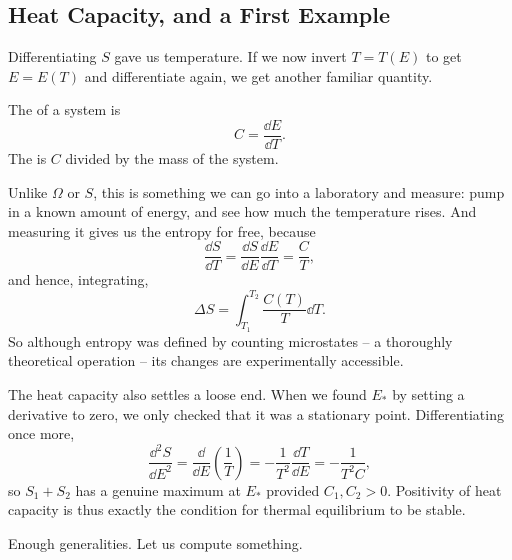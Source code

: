 \documentclass[a4paper]{scrartcl}
\begin{document}
\subsection{Heat Capacity, and a First Example}

Differentiating $S$ gave us temperature. If we now invert $T = T(E)$ to get $E = E(T)$ and differentiate again, we get another familiar quantity.

\begin{definition}
	The  of a system is
	$$
	C = \frac{\dd E}{\dd T}.
	$$
	The  is $C$ divided by the mass of the system.
\end{definition}

Unlike $\Omega$ or $S$, this is something we can go into a laboratory and measure: pump in a known amount of energy, and see how much the temperature rises. And measuring it gives us the entropy for free, because
$$
\frac{\dd S}{\dd T} = \frac{\dd S}{\dd E}\frac{\dd E}{\dd T} = \frac{C}{T},
$$
and hence, integrating,
$$
\Delta S = \int_{T_1}^{T_2} \frac{C(T)}{T} \dd T.
$$
So although entropy was defined by counting microstates -- a thoroughly theoretical operation -- its changes are experimentally accessible.

The heat capacity also settles a loose end. When we found $E_*$ by setting a derivative to zero, we only checked that it was a stationary point. Differentiating once more,
$$
\frac{\dd^2 S}{\dd E^2} = \frac{\dd}{\dd E}\left(\frac 1T\right) = -\frac{1}{T^2}\frac{\dd T}{\dd E} = -\frac{1}{T^2 C},
$$
so $S_1 + S_2$ has a genuine maximum at $E_*$ provided $C_1, C_2 > 0$. Positivity of heat capacity is thus exactly the condition for thermal equilibrium to be stable.

Enough generalities. Let us compute something.
\end{document}
